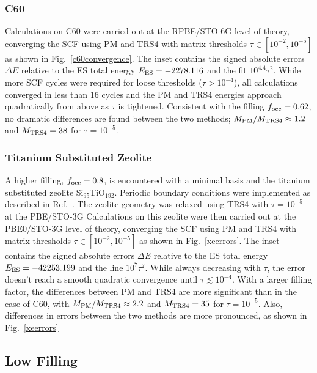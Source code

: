 \commentoutA{\documentclass[prb,aps,twocolumn,showpacs,twocolumngrid,superbib]{revtex4}}
\begin{document}
\subsubsection{C60}

Calculations on C60 were carried out at the RPBE/STO-6G level of theory, converging the
SCF using PM and TRS4 with matrix thresholds $\tau \in [10^{-2},10^{-5}]$ as shown in Fig.~\ref{c60convergence}.  The inset contains 
the signed absolute errors $\Delta E$ relative to the ES total energy $E_{\rm ES}=-2278.116$ 
and the fit $10^{4.4} \tau^2$.  While more SCF cycles were required for loose thresholds ($\tau > 10^{-4}$), 
all calculations converged in less than 16 cycles and the PM and TRS4 energies approach 
quadratically from above as $\tau$ is tightened.  Consistent with the filling $f_{\rm occ}=0.62$, no dramatic
differences are found between the two methods; $M_{\rm PM}/M_{\rm TRS4} \approx 1.2$ and 
$M_{\rm TRS4}=38$ for $\tau=10^{-5}$.   

\subsubsection{Titanium Substituted Zeolite}

A higher filling, $f_{\rm occ}=0.8$, is encountered with a minimal basis and the titanium substituted zeolite 
Si$_{95}$TiO$_{192}$.  Periodic boundary conditions were implemented as described in Ref.~.    
The zeolite geometry was relaxed using TRS4 with $\tau = 10^{-5}$ at the PBE/STO-3G 
Calculations on this zeolite were then carried out at the PBE0/STO-3G level of theory,  
converging the SCF using PM and TRS4 with matrix thresholds $\tau \in [10^{-2},10^{-5}]$
as shown in Fig.~\ref{xeerrors}.  The inset contains 
the signed absolute errors $\Delta E$ relative to the ES total energy $E_{\rm ES}=-42253.199$ and the line 
$10^{7} \tau^2$.  While always decreasing with $\tau$, the error doesn't reach a smooth quadratic convergence 
until $\tau \lesssim 10^{-4}$.  With a larger filling factor, the differences between PM and TRS4 are more 
significant than in the case of C60, with $M_{\rm PM}/M_{\rm TRS4} \approx 2.2$ and $M_{\rm TRS4}=35$ for $\tau=10^{-5}$.  
Also, differences in errors between the two methods are more pronounced, as shown in Fig.~\ref{xeerrors}

\subsection{Low Filling}
\end{document}
